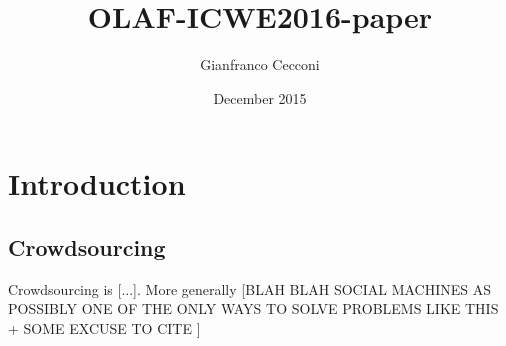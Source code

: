\documentclass{llncs}
\title{OLAF-ICWE2016-paper}
\author{Gianfranco Cecconi}
\institute{University of Southampton \email{gc1a13@soton.ac.uk}}
\date{December 2015}
\begin{document}
\maketitle

\section{Introduction}

\subsection{Crowdsourcing}

Crowdsourcing is {[}...{]}. More generally {[}BLAH BLAH SOCIAL MACHINES AS POSSIBLY ONE OF THE ONLY WAYS TO SOLVE PROBLEMS LIKE THIS + SOME EXCUSE TO CITE \cite{OReilly:2015uo}{]}


\end{document}
